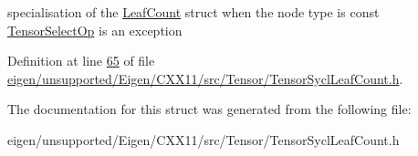 specialisation of the \hyperlink{struct_eigen_1_1_tensor_sycl_1_1internal_1_1_leaf_count}{Leaf\+Count} struct when the node type is const \hyperlink{class_eigen_1_1_tensor_select_op}{Tensor\+Select\+Op} is an exception 

Definition at line \hyperlink{eigen_2unsupported_2_eigen_2_c_x_x11_2src_2_tensor_2_tensor_sycl_leaf_count_8h_source_l00065}{65} of file \hyperlink{eigen_2unsupported_2_eigen_2_c_x_x11_2src_2_tensor_2_tensor_sycl_leaf_count_8h_source}{eigen/unsupported/\+Eigen/\+C\+X\+X11/src/\+Tensor/\+Tensor\+Sycl\+Leaf\+Count.\+h}.



The documentation for this struct was generated from the following file\+:\begin{DoxyCompactItemize}
\item 
eigen/unsupported/\+Eigen/\+C\+X\+X11/src/\+Tensor/\+Tensor\+Sycl\+Leaf\+Count.\+h\end{DoxyCompactItemize}
